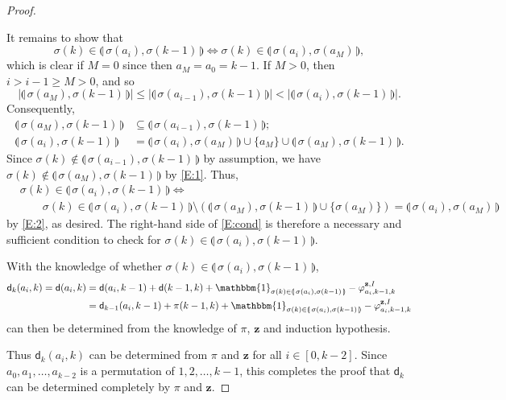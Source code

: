 \documentclass[11pt,a4paper,reqno]{amsart}
\numberwithin{equation}{section}
\theoremstyle{plain}
\theoremstyle{definition}
\theoremstyle{remark}
\numberwithin{equation}{section}
\newcommand{\bbone}{\mathbbm{1}}
\newcommand{\bz}{\mathbf{z}}
\newcommand{\ff}{\varphi}
\newcommand{\dd}{\mathsf{d}}
\newcommand{\ft}[2]{\llparenthesis\, #1,#2 \,\rrparenthesis}
\begin{document}
\begin{proof}
\begin{description}
It remains to show that
$$
\sigma(k) \in \ft{\sigma(a_{i})}{\sigma(k-1)} \Leftrightarrow \sigma(k) \in \ft{\sigma(a_{i})}{\sigma(a_{M})},
$$
which is clear if $M= 0$ since then $a_M = a_0 = k-1$.
If $M >0$, then $i > i-1 \geq M > 0$, and so
$$
|\ft{\sigma(a_M)}{\sigma(k-1)}| \leq |\ft{\sigma(a_{i-1})}{\sigma(k-1)}| < |\ft{\sigma(a_i)}{\sigma(k-1)}|.
$$
Consequently,
\begin{align}
\ft{\sigma(a_M)}{\sigma(k-1)} &\subseteq \ft{\sigma(a_{i-1})}{\sigma(k-1)}; \label{E:1} \\
\ft{\sigma(a_i)}{\sigma(k-1)} &= \ft{\sigma(a_i)}{\sigma(a_{M})} \cup \{ a_{M} \} \cup \ft{\sigma(a_{M})}{\sigma(k-1)}. \label{E:2}
\end{align}
Since $\sigma(k) \notin \ft{\sigma(a_{i-1})}{\sigma(k-1)}$ by assumption, we have $\sigma(k) \notin \ft{\sigma(a_{M})}{\sigma(k-1)}$ by \eqref{E:1}.
Thus,
\begin{align*}
&\sigma(k) \in \ft{\sigma(a_i)}{\sigma(k-1)}
\Leftrightarrow \\
&\qquad \sigma(k) \in \ft{\sigma(a_i)}{\sigma(k-1)} \setminus (\ft{\sigma(a_{M})}{\sigma(k-1)}
\cup \{\sigma(a_M)\} ) = \ft{\sigma(a_i)}{\sigma(a_M)}
\end{align*}
by \eqref{E:2},
as desired.
The right-hand side of \eqref{E:cond} is therefore a necessary and sufficient condition to check for $\sigma(k) \in \ft{\sigma(a_{i})}{\sigma(k-1)}$.
\end{description}
With the knowledge of whether $\sigma(k) \in \ft{\sigma(a_i)}{\sigma(k-1)}$,
\begin{align*}
\dd_k(a_i,k) = \dd(a_i,k)
&= \dd(a_i,k-1) + \dd(k-1,k) + \bbone_{\sigma(k) \in \ft{\sigma(a_i)}{\sigma(k-1)}} - \ff^{\bz,I}_{a_i,k-1,k} \\
&= \dd_{k-1}(a_i,k-1) + \pi(k-1,k) + \bbone_{\sigma(k) \in \ft{\sigma(a_i)}{\sigma(k-1)}} - \ff^{\bz,I}_{a_i,k-1,k}
\end{align*}
can then be determined from the knowledge of $\pi$, $\bz$ and induction hypothesis.

Thus $\dd_k(a_i,k)$ can be determined from $\pi$ and $\bz$ for all $i \in [0,k-2]$.
Since $a_0,a_1,\dotsc, a_{k-2}$ is a permutation of $1,2,\dotsc, k-1$, this completes the proof that $\dd_k$ can be determined completely by $\pi$ and $\bz$.


\end{proof}
\end{document}
